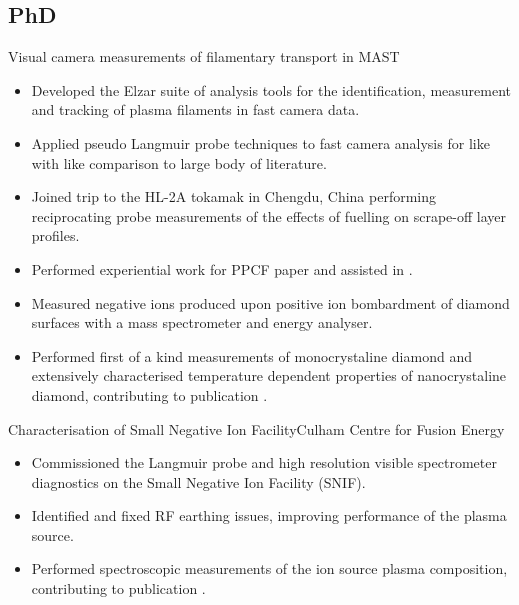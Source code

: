 \documentclass[11pt,a4paper,sans]{moderncv}        %
\begin{document}
\subsection{PhD}
{Visual camera measurements of filamentary transport in MAST}{}{}{}
{\begin{itemize}%
\item Developed the Elzar suite of analysis tools for the identification, measurement and tracking of plasma filaments in fast camera data.
\item Applied pseudo Langmuir probe techniques to fast camera analysis for like with like comparison to large body of literature.
\item Joined trip to the HL-2A tokamak in Chengdu, China performing reciprocating probe measurements of the effects of fuelling on scrape-off layer profiles.
\item Performed experiential work for PPCF paper \cite{Militello2016a} and assisted in \cite{Walkden2017}.
\end{itemize}}

{\begin{itemize}%
\item Measured negative ions produced upon positive ion bombardment of diamond surfaces with a mass spectrometer and energy analyser. 
\item Performed first of a kind measurements of monocrystaline diamond and extensively characterised temperature dependent properties of nanocrystaline diamond, contributing to publication \cite{Cartry2017}.
\end{itemize}}
\newpage
{}
{Characterisation of Small Negative Ion Facility}{\newline Culham Centre for Fusion Energy}
{}
{}{\begin{itemize}%
\item Commissioned the Langmuir probe and high resolution visible spectrometer diagnostics on the Small Negative Ion Facility (SNIF).
\item Identified and fixed RF earthing issues, improving performance of the plasma source.
\item Performed spectroscopic measurements of the ion source plasma composition, contributing to publication \cite{Zacks2017}.
\end{itemize}}
\end{document}
